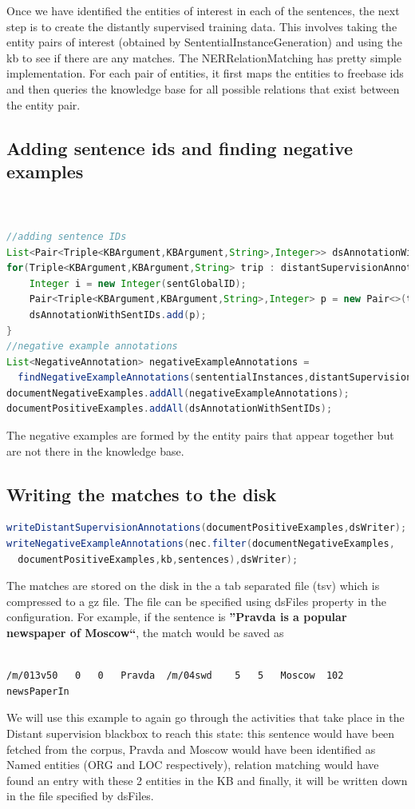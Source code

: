\documentclass[a4paper,10pt]{report}
\begin{document}
Once we have identified the entities of interest in each of the sentences, the next step is to create the distantly supervised training data. 
This involves taking the entity pairs of interest (obtained by SententialInstanceGeneration) and using the kb to see if there are any matches. 
The NERRelationMatching has pretty simple implementation. For each pair of entities, it first maps the entities to freebase ids and then queries the knowledge
base for all possible relations that exist between the entity pair.



\subsection{Adding sentence ids and finding negative examples}
\begin{lstlisting}[language=java]


//adding sentence IDs
List<Pair<Triple<KBArgument,KBArgument,String>,Integer>> dsAnnotationWithSentIDs = new ArrayList<>();
for(Triple<KBArgument,KBArgument,String> trip : distantSupervisionAnnotations){
	Integer i = new Integer(sentGlobalID);
	Pair<Triple<KBArgument,KBArgument,String>,Integer> p = new Pair<>(trip,i);
	dsAnnotationWithSentIDs.add(p);
}
//negative example annotations
List<NegativeAnnotation> negativeExampleAnnotations =
  findNegativeExampleAnnotations(sententialInstances,distantSupervisionAnnotations,kb,sentGlobalID);
documentNegativeExamples.addAll(negativeExampleAnnotations);
documentPositiveExamples.addAll(dsAnnotationWithSentIDs);				
\end{lstlisting}
The negative examples are formed by the entity pairs that appear together but are not there in the knowledge base.

\subsection{Writing the matches to the disk}
\begin{lstlisting}[language=java]
writeDistantSupervisionAnnotations(documentPositiveExamples,dsWriter);
writeNegativeExampleAnnotations(nec.filter(documentNegativeExamples,
  documentPositiveExamples,kb,sentences),dsWriter);
\end{lstlisting}

The matches are stored on the disk in the a tab separated file (tsv) which is compressed to a gz file. The file can be specified using 
dsFiles property in the configuration. For example, if the sentence is \textbf{''Pravda is a popular newspaper of Moscow``}, the match would be saved
as 
\begin{verbatim}
 
/m/013v50	0	0	Pravda	/m/04swd	5	5	Moscow	102	newsPaperIn

\end{verbatim}

We will use this example to again go through the activities that take place in the  Distant supervision blackbox to reach this state: this sentence would have been fetched from the 
corpus, Pravda and Moscow would have been identified as Named entities (ORG and LOC respectively), relation matching would have found an entry with these 2 entities
in the KB and finally, it will be written down in the file specified by dsFiles.
\end{document}
